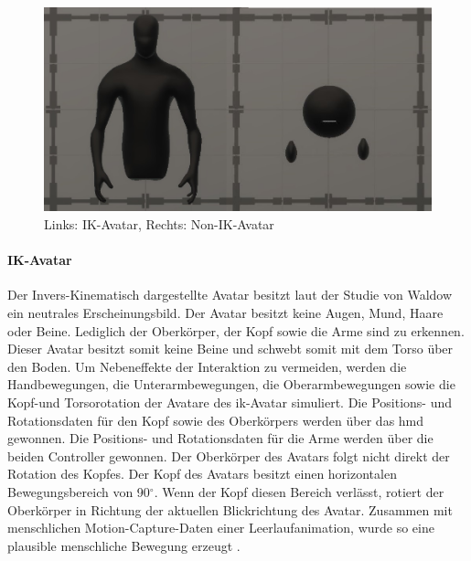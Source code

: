 \documentclass[a4paper,11pt]{article}%
\renewcommand{\\}{\vspace*{0.5\baselineskip} \newline}
\begin{document}
	\begin{figure}[H]
		\begin{footnotesize}
		\centering
			\includegraphics[scale=0.6]{Abbildungen/Avatars.JPG}
			
			\caption[Abbildung 1]{Links: IK-Avatar, Rechts: Non-IK-Avatar}
			\label{AvatareAussehen}
		\end{footnotesize}
	\end{figure}
		\paragraph{IK-Avatar}
Der Invers-Kinematisch dargestellte Avatar besitzt laut der Studie von Waldow \citep[p.251]{waldow2019investigating} ein neutrales Erscheinungsbild. Der Avatar besitzt keine Augen, Mund, Haare oder Beine. Lediglich der Oberkörper, der Kopf sowie die Arme sind zu erkennen. Dieser Avatar besitzt somit keine Beine und schwebt somit mit dem Torso über den Boden.
Um Nebeneffekte der Interaktion zu vermeiden, werden die Handbewegungen, die Unterarmbewegungen, die Oberarmbewegungen sowie die Kopf-und Torsorotation der Avatare des \ac{ik}-Avatar simuliert. Die Positions- und Rotationsdaten für den Kopf sowie des Oberkörpers werden über das \ac{hmd} gewonnen. Die Positions- und Rotationsdaten für die Arme werden über die beiden Controller gewonnen. Der Oberkörper des Avatars folgt nicht direkt der Rotation des Kopfes. Der Kopf des Avatars besitzt einen horizontalen Bewegungsbereich von 90$^\circ$. Wenn der Kopf diesen Bereich verlässt, rotiert der Oberkörper in Richtung der aktuellen Blickrichtung des Avatar. Zusammen mit menschlichen Motion-Capture-Daten einer Leerlaufanimation, wurde so eine plausible menschliche Bewegung erzeugt \citep[p.251]{waldow2019investigating}.
\end{document}

